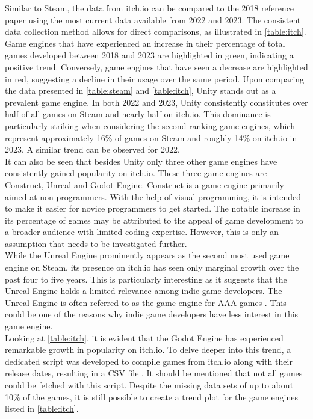 Similar to Steam, the data from itch.io can be compared to the 2018 reference paper using the most current data available from 2022 and 2023.
The consistent data collection method allows for direct comparisons, as illustrated in \autoref{table:itch}.
Game engines that have experienced an increase in their percentage of total games developed between 2018 and 2023 are highlighted in green, indicating a positive trend.
Conversely, game engines that have seen a decrease are highlighted in red, suggesting a decline in their usage over the same period.
Upon comparing the data presented in \autoref{table:steam} and \autoref{table:itch}, Unity stands out as a prevalent game engine.
In both 2022 and 2023, Unity consistently constitutes over half of all games on Steam and nearly half on itch.io.
This dominance is particularly striking when considering the second-ranking game engines, which represent approximately 16\% of games on Steam and roughly 14\% on itch.io in 2023.
A similar trend can be observed for 2022. \\

It can also be seen that besides Unity only three other game engines have consistently gained popularity on itch.io.
These three game engines are Construct, Unreal and Godot Engine.
Construct is a game engine primarily aimed at non-programmers.
With the help of visual programming, it is intended to make it easier for novice programmers to get started.
The notable increase in its percentage of games may be attributed to the appeal of game development to a broader audience with limited coding expertise.
However, this is only an assumption that needs to be investigated further. \\

While the Unreal Engine prominently appears as the second most used game engine on Steam, its presence on itch.io has seen only marginal growth over the past four to five years.
This is particularly interesting as it suggests that the Unreal Engine holds a limited relevance among indie game developers.
The Unreal Engine is often referred to as the game engine for AAA games \cite{unreal-tripple-a-yager, unreal-tripple-a-india}.
This could be one of the reasons why indie game developers have less interest in this game engine. \\

Looking at \autoref{table:itch}, it is evident that the Godot Engine has experienced remarkable growth in popularity on itch.io.
To delve deeper into this trend, a dedicated script was developed to compile games from itch.io along with their release dates, resulting in a CSV file \cite{github-trend-itch}.
It should be mentioned that not all games could be fetched with this script.
Despite the missing data sets of up to about 10\% of the games, it is still possible to create a trend plot for the game engines listed in \autoref{table:itch}.

